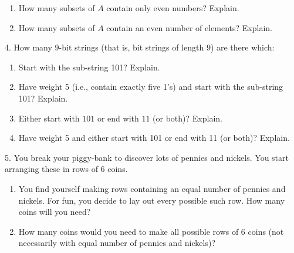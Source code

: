 \documentclass[10pt,]{book}
\theoremstyle{plain}
\theoremstyle{definition}
\numberwithin{equation}{chapter}
\begin{document}
\begin{exerciselist}
\begin{enumerate}[label=(\alph*)]
\item\hypertarget{li-232}{}
                How many subsets of \(A\) contain only even numbers? Explain.


\item\hypertarget{li-233}{}
                How many subsets of \(A\) contain an even number of elements? Explain.


\end{enumerate}

\par\smallskip
\item[4.]\hypertarget{exercise-59}{}
            How many \(9\)-bit strings (that is, bit strings of length 9) are there which:
          \leavevmode%
\begin{enumerate}[label=(\alph*)]
\item\hypertarget{li-234}{}
                Start with the sub-string 101? Explain.


\item\hypertarget{li-235}{}
                Have weight 5 (i.e., contain exactly five 1's) and start with the sub-string 101? Explain.


\item\hypertarget{li-236}{}
                Either start with \(101\) or end with \(11\) (or both)? Explain.


\item\hypertarget{li-237}{}
                Have weight 5 and either start with 101 or end with 11 (or both)? Explain.


\end{enumerate}

\par\smallskip
\item[5.]\hypertarget{exercise-60}{}
            You break your piggy-bank to discover lots of pennies and nickels. You start arranging these in rows of 6 coins.
          \leavevmode%
\begin{enumerate}[label=(\alph*)]
\item\hypertarget{li-238}{} You find yourself making rows containing an equal number of pennies and nickels.  For fun, you decide to lay out every possible such row.  How many coins will you need? %
\item\hypertarget{li-239}{} How many coins would you need to make all possible rows of 6 coins (not necessarily with equal number of pennies and nickels)? %
\end{enumerate}


\end{exerciselist}
\end{document}
